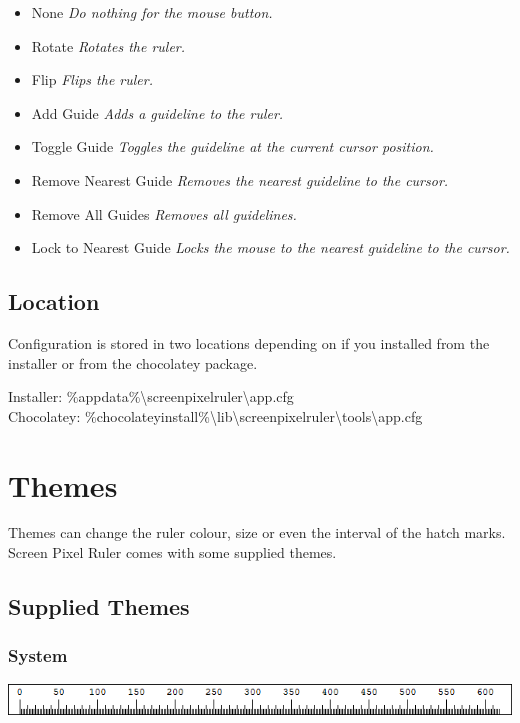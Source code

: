\documentclass[
]{book}
\providecommand{\tightlist}{%
  \setlength{\itemsep}{0pt}\setlength{\parskip}{0pt}}
\begin{document}
\begin{itemize}
\tightlist
\item
  None \emph{Do nothing for the mouse button.}
\item
  Rotate \emph{Rotates the ruler.}
\item
  Flip \emph{Flips the ruler.}
\item
  Add Guide \emph{Adds a guideline to the ruler.}
\item
  Toggle Guide \emph{Toggles the guideline at the current cursor position.}
\item
  Remove Nearest Guide \emph{Removes the nearest guideline to the cursor.}
\item
  Remove All Guides \emph{Removes all guidelines.}
\item
  Lock to Nearest Guide \emph{Locks the mouse to the nearest guideline to the cursor.}
\end{itemize}

\section{Location}\label{location}

Configuration is stored in two locations depending on if you installed from the installer or from the chocolatey package.

Installer: \%appdata\%\textbackslash screenpixelruler\textbackslash app.cfg\\
Chocolatey: \%chocolateyinstall\%\textbackslash lib\textbackslash screenpixelruler\textbackslash tools\textbackslash app.cfg

\chapter{Themes}\label{themes}

Themes can change the ruler colour, size or even the interval of the hatch marks.
Screen Pixel Ruler comes with some supplied themes.

\section{Supplied Themes}\label{supplied-themes}

\subsection{System}\label{system}

\includegraphics{images/theme-default.png}
\end{document}
